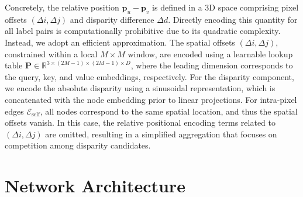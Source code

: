 Concretely, the relative position $\mathbf{p}_u - \mathbf{p}_v$ is defined in a 3D space comprising pixel offsets $(\Delta i, \Delta j)$ and disparity difference $\Delta d$. 
Directly encoding this quantity for all label pairs is computationally prohibitive due to its quadratic complexity. 
Instead, we adopt an efficient approximation. 
The spatial offsets $(\Delta i, \Delta j)$, constrained within a local $M \times M$ window, are encoded using a learnable lookup table $\mathbf{P} \in \mathbb{R}^{3 \times (2M-1) \times (2M-1) \times D}$, where the leading dimension corresponds to the query, key, and value embeddings, respectively. 
For the disparity component, we encode the absolute disparity using a sinusoidal representation, which is concatenated with the node embedding prior to linear projections.
For intra-pixel edges $\mathcal{E}_{\mathrm{self}}$, all nodes correspond to the same spatial location, and thus the spatial offsets vanish. 
In this case, the relative positional encoding terms related to $(\Delta i, \Delta j)$ are omitted, resulting in a simplified aggregation that focuses on competition among disparity candidates.

\section{Network Architecture}

